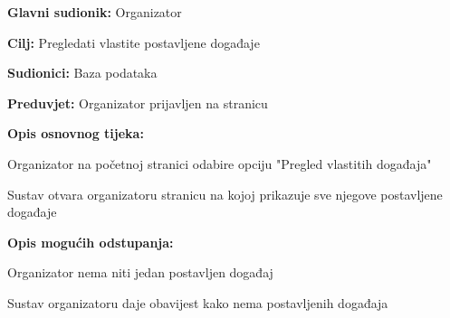 					\noindent {}
\begin{packed_item}
	\item \textbf{Glavni sudionik:} Organizator
	\item  \textbf{Cilj:} Pregledati vlastite postavljene događaje 
	\item  \textbf{Sudionici:} Baza podataka
	\item  \textbf{Preduvjet:} Organizator prijavljen na stranicu
	\item  \textbf{Opis osnovnog tijeka:}
	
	\item[] \begin{packed_enum}
		
		\item Organizator na početnoj stranici odabire opciju "Pregled vlastitih događaja"
		\item Sustav otvara organizatoru stranicu na kojoj prikazuje sve njegove postavljene događaje
	\end{packed_enum}
	
	\item  \textbf{Opis mogućih odstupanja:}
	
	\item[] \begin{packed_item}
		
		\item[2.a] Organizator nema niti jedan postavljen događaj
		\item[] \begin{packed_enum}
			
			\item Sustav organizatoru daje obavijest kako nema postavljenih događaja
			
		\end{packed_enum}
	\end{packed_item}
\end{packed_item}

